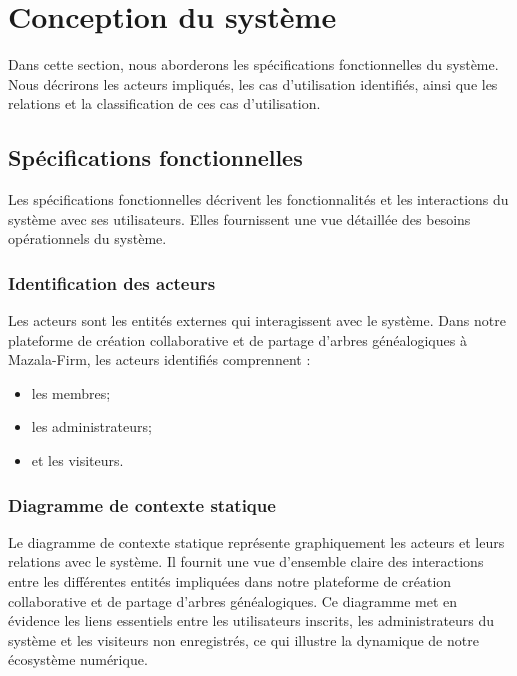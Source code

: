 \section{Conception du système}
Dans cette section, nous aborderons les spécifications fonctionnelles du
système. Nous décrirons les acteurs impliqués, les cas d’utilisation identifiés,
ainsi que les relations et la classification de ces cas d’utilisation.

\subsection{Spécifications fonctionnelles}
Les spécifications fonctionnelles décrivent les fonctionnalités et les interactions
du système avec ses utilisateurs. Elles fournissent une vue détaillée des
besoins opérationnels du système.

\subsubsection{Identification des acteurs}
Les acteurs sont les entités externes qui interagissent avec le système.
Dans notre plateforme de création collaborative et de partage d'arbres
généalogiques à Mazala-Firm, les acteurs identifiés comprennent :

\begin{itemize}
  \item les membres;

  \item les administrateurs;

  \item et les visiteurs.

\end{itemize}

\subsubsection{Diagramme de contexte statique}
Le diagramme de contexte statique représente graphiquement les acteurs et leurs
relations avec le système. Il fournit une vue d’ensemble claire des interactions
entre les différentes entités impliquées dans notre plateforme de création
collaborative et de partage d’arbres généalogiques. Ce diagramme met en évidence
les liens essentiels entre les utilisateurs inscrits, les administrateurs du
système et les visiteurs non enregistrés, ce qui illustre la dynamique de
notre écosystème numérique.

